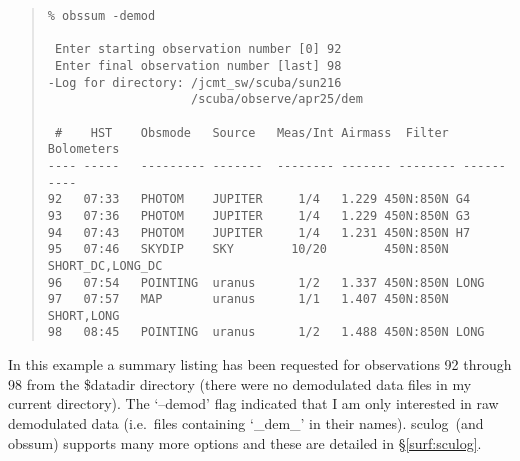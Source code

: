 \documentclass[twoside,11pt]{article}
\newcommand{\task}[1]{{\sf #1}}
\newcommand{\sculog}{\htmlref{\task{sculog}}{SCULOG}}
\newcommand{\obssum}{\htmlref{\task{obssum}}{OBSSUM}}
\newenvironment{myquote}{\begin{quote}\begin{small}}{\end{small}\end{quote}}
\newcommand{\htmlref}[2]{#1}
\begin{document}
\begin{myquote}
\begin{verbatim}
% obssum -demod
 
 Enter starting observation number [0] 92
 Enter final observation number [last] 98
-Log for directory: /jcmt_sw/scuba/sun216
                    /scuba/observe/apr25/dem
 
 #    HST    Obsmode   Source   Meas/Int Airmass  Filter  Bolometers
---- -----   --------- -------  -------- ------- -------- ----------
92   07:33   PHOTOM    JUPITER     1/4   1.229 450N:850N G4
93   07:36   PHOTOM    JUPITER     1/4   1.229 450N:850N G3
94   07:43   PHOTOM    JUPITER     1/4   1.231 450N:850N H7
95   07:46   SKYDIP    SKY        10/20        450N:850N SHORT_DC,LONG_DC
96   07:54   POINTING  uranus      1/2   1.337 450N:850N LONG
97   07:57   MAP       uranus      1/1   1.407 450N:850N SHORT,LONG
98   08:45   POINTING  uranus      1/2   1.488 450N:850N LONG
\end{verbatim}
\end{myquote}
In this example a summary listing has been requested for observations 92
through 98 from the {\sc \$datadir} directory %
(there were no
demodulated data files in my current directory).  The `--demod' flag indicated
that I am only interested in raw demodulated data (i.e.\ files containing
`\_dem\_' in their names). \sculog\ (and \obssum) supports many more options
and these are detailed in \S\ref{surf:sculog}.
\end{document}
